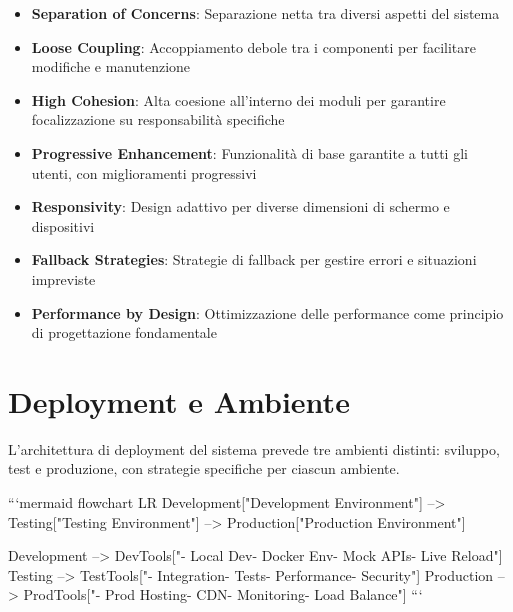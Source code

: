 \begin{itemize}
    \item \textbf{Separation of Concerns}: Separazione netta tra diversi aspetti del sistema
    \item \textbf{Loose Coupling}: Accoppiamento debole tra i componenti per facilitare modifiche e manutenzione
    \item \textbf{High Cohesion}: Alta coesione all'interno dei moduli per garantire focalizzazione su responsabilità specifiche
    \item \textbf{Progressive Enhancement}: Funzionalità di base garantite a tutti gli utenti, con miglioramenti progressivi
    \item \textbf{Responsivity}: Design adattivo per diverse dimensioni di schermo e dispositivi
    \item \textbf{Fallback Strategies}: Strategie di fallback per gestire errori e situazioni impreviste
    \item \textbf{Performance by Design}: Ottimizzazione delle performance come principio di progettazione fondamentale
\end{itemize}

\section{Deployment e Ambiente}
L'architettura di deployment del sistema prevede tre ambienti distinti: sviluppo, test e produzione, con strategie specifiche per ciascun ambiente.

```mermaid
flowchart LR
    Development["Development Environment"] --> Testing["Testing Environment"] --> Production["Production Environment"]
    
    Development --> DevTools["- Local Dev\n- Docker Env\n- Mock APIs\n- Live Reload"]
    Testing --> TestTools["- Integration\n- Tests\n- Performance\n- Security"]
    Production --> ProdTools["- Prod Hosting\n- CDN\n- Monitoring\n- Load Balance"]
```
